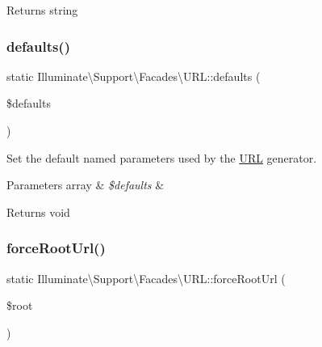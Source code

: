 \begin{DoxyReturn}{Returns}
string 
\end{DoxyReturn}
\mbox{\label{class_illuminate_1_1_support_1_1_facades_1_1_u_r_l_a844811bd73afb16607a1cdbafc8d1655}} 
\subsubsection{\texorpdfstring{defaults()}{defaults()}}
{\footnotesize\ttfamily static Illuminate\textbackslash{}\+Support\textbackslash{}\+Facades\textbackslash{}\+U\+R\+L\+::defaults (\begin{DoxyParamCaption}\item[{}]{\$defaults }\end{DoxyParamCaption})\hspace{0.3cm}{\ttfamily [static]}}

Set the default named parameters used by the \mbox{\hyperlink{class_illuminate_1_1_support_1_1_facades_1_1_u_r_l}{U\+RL}} generator.


\begin{DoxyParams}[1]{Parameters}
array & {\em \$defaults} & \\
\hline
\end{DoxyParams}
\begin{DoxyReturn}{Returns}
void 
\end{DoxyReturn}
\mbox{\label{class_illuminate_1_1_support_1_1_facades_1_1_u_r_l_affa0a278515bdee828f5423493113e96}} 
\subsubsection{\texorpdfstring{force\+Root\+Url()}{forceRootUrl()}}
{\footnotesize\ttfamily static Illuminate\textbackslash{}\+Support\textbackslash{}\+Facades\textbackslash{}\+U\+R\+L\+::force\+Root\+Url (\begin{DoxyParamCaption}\item[{}]{\$root }\end{DoxyParamCaption})\hspace{0.3cm}{\ttfamily [static]}}

